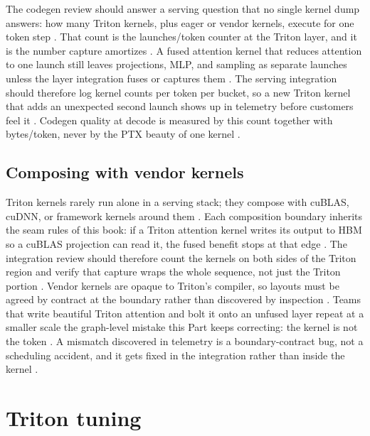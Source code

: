 The codegen review should answer a serving question that no single kernel dump answers: how many Triton kernels, plus eager or vendor kernels, execute for one token step \citep{taxbreak2026,patel2025llminference}. That count is the launches/token counter at the Triton layer, and it is the number capture amortizes \citep{nvidia2024cudagraphs,memoryfloor2026}. A fused attention kernel that reduces attention to one launch still leaves projections, MLP, and sampling as separate launches unless the layer integration fuses or captures them \citep{dao2022flashattention,taxbreak2026}. The serving integration should therefore log kernel counts per token per bucket, so a new Triton kernel that adds an unexpected second launch shows up in telemetry before customers feel it \citep{patel2025llminference,memoryfloor2026}. Codegen quality at decode is measured by this count together with bytes/token, never by the PTX beauty of one kernel \citep{chen2020compilerbasedhardw,memoryfloor2026}.

\subsection{Composing with vendor kernels}

Triton kernels rarely run alone in a serving stack; they compose with cuBLAS, cuDNN, or framework kernels around them \citep{patel2025llminference,tritonlang2024}. Each composition boundary inherits the seam rules of this book: if a Triton attention kernel writes its output to HBM so a cuBLAS projection can read it, the fused benefit stops at that edge \citep{memoryfloor2026,dao2022flashattention}. The integration review should therefore count the kernels on both sides of the Triton region and verify that capture wraps the whole sequence, not just the Triton portion \citep{nvidia2024cudagraphs,taxbreak2026}. Vendor kernels are opaque to Triton's compiler, so layouts must be agreed by contract at the boundary rather than discovered by inspection \citep{chen2020compilerbasedhardw,patel2025llminference}. Teams that write beautiful Triton attention and bolt it onto an unfused layer repeat at a smaller scale the graph-level mistake this Part keeps correcting: the kernel is not the token \citep{memoryfloor2026,patel2025llminference}. A mismatch discovered in telemetry is a boundary-contract bug, not a scheduling accident, and it gets fixed in the integration rather than inside the kernel \citep{memoryfloor2026,patel2025llminference}.

\section{Triton tuning}
\label{sec:ch17_triton_tuning}

